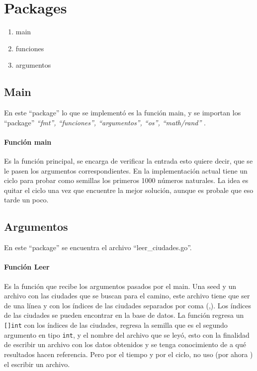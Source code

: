 \documentclass[
10pt,
a4paper,
oneside,
headinclude,footinclude,
BCOR5mm,
]{article}
\begin{document}
\section{Packages}

\begin{enumerate}[noitemsep]
\item main
\item funciones
\item argumentos
\end{enumerate}

\subsection{Main}

En este ``package'' lo que se implementó es la función main, y se importan los
``package'' \textit{``fmt'', ``funciones'', ``argumentos'', ``os'',  ``math/rand''
}.

\paragraph{Función main} Es la función principal, se encarga de verificar la
entrada esto quiere decir, que se le pasen los argumentos correspondientes. En
la implementación actual tiene un ciclo para probar como semillas los primeros
1000 números naturales. La idea es quitar el ciclo una vez que encuentre la mejor
solución, aunque es probale que eso tarde un poco.

\subsection{Argumentos}
En este ``package'' se encuentra el archivo ``leer\_ciudades.go''.
\paragraph{Función Leer} Es la función que recibe los argumentos pasados por el
main. Una seed y un archivo con las ciudades que se buscan para el camino, este
archivo tiene que ser de una línea y con los índices de las ciudades separados
por coma (,). Los índices de las ciudades se pueden encontrar en la base de
datos. La función regresa un \texttt{[]int} con los índices
de las ciudades, regresa la semilla que es el segundo argumento en tipo
\texttt{int}, y el nombre del archivo que se leyó, esto con la finalidad de
escribir un archivo con los datos obtenidos y se tenga conocimiento de a qué
resultados hacen referencia. Pero por el tiempo y por el ciclo, no uso (por ahora
) el escribir un archivo.
\end{document}
